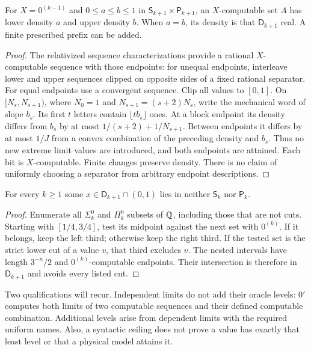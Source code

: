 \begin{lemma}\label{lem:relative-density}
For $X=0^{(k-1)}$ and $0\leq a\leq b\leq1$ in
$\mathsf S_{k+1}\times\mathsf P_{k+1}$, an $X$-computable set $A$
has lower density $a$ and upper density $b$. When $a=b$, its density
is that $\mathsf D_{k+1}$ real. A finite prescribed prefix can be added.
\end{lemma}
\begin{proof}
The relativized sequence characterizations
\cite[Theorem~5.1 and Corollaries~5.4--5.5]{density} provide a rational
$X$-computable sequence with those endpoints: for unequal endpoints,
interleave lower and upper sequences clipped on opposite sides of a
fixed rational separator. For equal endpoints use a convergent sequence.
Clip all values to $[0,1]$. On $[N_s,N_{s+1})$, where $N_0=1$ and
$N_{s+1}=(s+2)N_s$, write the mechanical word of slope $b_s$.
Its first $t$ letters contain $\lfloor t b_s\rfloor$ ones. At a block
endpoint its density differs from $b_s$ by at most
$1/(s+2)+1/N_{s+1}$. Between endpoints it differs by at most $1/J$
from a convex combination of the preceding density and $b_s$.
Thus no new extreme limit values are introduced, and both endpoints
are attained. Each bit is $X$-computable. Finite changes preserve density.
There is no claim of uniformly choosing a separator from arbitrary
endpoint descriptions.
\end{proof}

\begin{lemma}\label{lem:diagonal}
For every $k\geq1$ some $x\in\mathsf D_{k+1}\cap(0,1)$ lies in
neither $\mathsf S_k$ nor $\mathsf P_k$.
\end{lemma}
\begin{proof}
Enumerate all $\Sigma^0_k$ and $\Pi^0_k$ subsets of $\mathbb Q$, including
those that are not cuts. Starting with $[1/4,3/4]$, test its midpoint
against the next set with $0^{(k)}$. If it belongs, keep the left third;
otherwise keep the right third. If the tested set is the strict lower
cut of a value $v$, that third excludes $v$. The nested intervals have
length $3^{-n}/2$ and $0^{(k)}$-computable endpoints. Their intersection
is therefore in $\mathsf D_{k+1}$ and avoids every listed cut.
\end{proof}

Two qualifications will recur. Independent limits do not add their oracle
levels: $0'$ computes both limits of two computable sequences and their
defined computable combination. Additional levels arise from dependent
limits with the required uniform names. Also, a syntactic ceiling
does not prove a value has exactly that least level or that a physical
model attains it.
